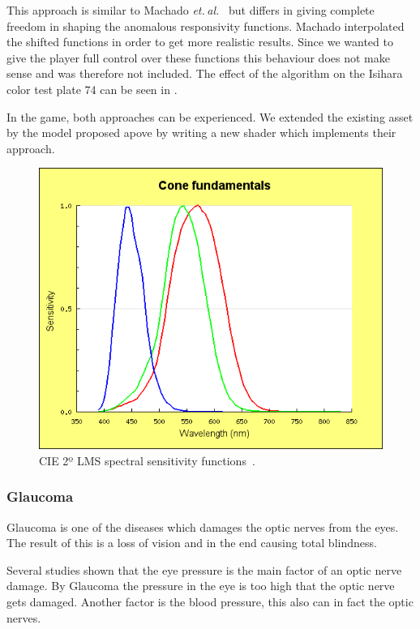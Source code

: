 \documentclass{sig-alternate-05-2015}
\newcommand{\etal}{\textit{et. al.}}
\begin{document}
This approach is similar to Machado \etal~\cite{Machado2009} but differs in giving complete freedom in shaping the anomalous responsivity functions.
Machado interpolated the shifted functions in order to get more realistic results.
Since we wanted to give the player full control over these functions this behaviour does not make sense and was therefore not included.
The effect of the algorithm on the Isihara color test plate 74 can be seen in .

In the game, both approaches can be experienced.
We extended the existing asset by the model proposed apove by writing a new shader which implements their approach.

\begin{figure}
    \centering
    \includegraphics[width=\columnwidth]{lms-sensitivity.png}
    \caption{CIE 2º LMS spectral sensitivity functions~\cite{cvrl-lms-web}.}
    \label{fig:lmscurves}
\end{figure}

\subsubsection{Glaucoma}

Glaucoma is one of the diseases which damages the optic nerves from the eyes. The result of this is a loss of vision and in the end causing total blindness. 

Several studies shown that the eye pressure is the main factor of an optic nerve damage. By Glaucoma the pressure in the eye is too high that the optic nerve gets damaged. Another factor is the blood pressure, this also can in fact the optic nerves.
\end{document}
